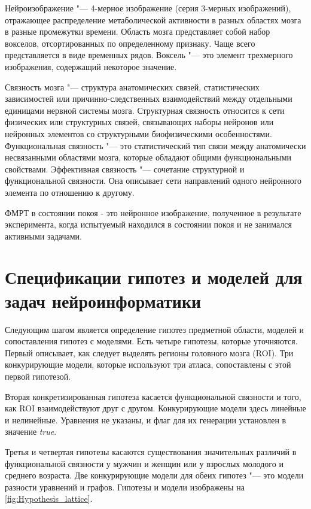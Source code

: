 Нейроизображение "--- 4-мерное изображение (серия 3-мерных изображений), отражающее распределение метаболической 
активности в разных областях мозга в разные промежутки времени. Область мозга представляет собой набор вокселов, 
отсортированных по определенному признаку. Чаще всего представляется в виде временных рядов. Воксель "--- это элемент 
трехмерного изображения, содержащий некоторое значение.

Связность мозга "--- структура анатомических связей, статистических зависимостей или причинно-следственных 
взаимодействий между отдельными единицами нервной системы мозга. Структурная связность относится к сети физических 
или структурных связей, связывающих наборы нейронов или нейронных элементов со структурными биофизическими 
особенностями. Функциональная связность "--- это статистический тип связи между анатомически несвязанными областями 
мозга, которые обладают общими функциональными свойствами. Эффективная связность "--- сочетание структурной и 
функциональной связности. Она описывает сети направлений одного нейронного элемента по отношению к другому.

ФМРТ в состоянии покоя - это нейронное изображение, полученное в результате эксперимента, когда испытуемый находился 
в состоянии покоя и не занимался активными задачами.

\section{Спецификации гипотез и моделей для задач нейроинформатики}\label{sect_5_2}

Следующим шагом является определение гипотез предметной области, моделей и сопоставления гипотез с моделями. 
Есть четыре гипотезы, которые уточняются. Первый описывает, как следует выделять регионы головного мозга (ROI). 
Три конкурирующие модели, которые используют три атласа, сопоставлены с этой первой гипотезой. 

Вторая конкретизированная гипотеза касается функциональной связности и того, как ROI взаимодействуют друг с другом. 
Конкурирующие модели здесь линейные и нелинейные. Уравнения не указаны, и флаг для их генерации 
установлен в значение \textit{true}. 

Третья и четвертая гипотезы касаются существования значительных различий в функциональной связности у 
мужчин и женщин или у взрослых молодого и среднего возраста. Две конкурирующие модели для обеих гипотез "--- это 
модели разности уравнений и графов. Гипотезы и модели изображены на \cref{fig:Hypothesis_lattice}.

